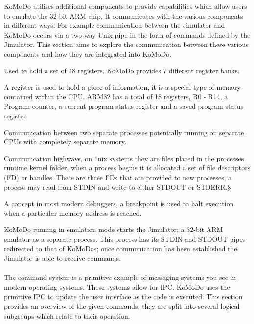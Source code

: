 KoMoDo utilises additional components to provide capabilities which allow users to emulate the 32-bit ARM chip. It communicates with the various components in different ways. For example communication between the Jimulator and KoMoDo occurs via a two-way Unix pipe in the form of commands defined by the Jimulator. This section aims to explore the communication between these various components and how they are integrated into KoMoDo.

  \begin{description}[leftmargin=!,labelwidth=\widthof{\bfseries \footnotesize inter process communication}]
    \item[\footnotesize Register bank] Used to hold a set of 18 registers. KoMoDo provides 7 different register banks.
    \item[\footnotesize Register] A register is used to hold a piece of information, it is a special type of memory contained within the CPU. ARM32 has a total of 18 registers, R0 - R14, a Program counter, a current program status register and a saved program status register.
    \item[\footnotesize Inter process communication] Communication between two separate processes potentially running on separate CPUs with completely separate memory.
    \item[\footnotesize (*nix) pipes] Communication highways, on *nix systems they are files placed in the processes runtime kernel folder, when a process begins it is allocated a set of file descriptors (FD) or handles. There are three FDs that are provided to new processes; a process may read from STDIN and write to  either STDOUT or STDERR.§
    \item[\footnotesize breakpoint] A concept in most modern debuggers, a breakpoint is used to halt execution when a particular memory address is reached.
  \end{description}
%
KoMoDo running in emulation mode starts the Jimulator; a 32-bit ARM emulator as a separate process. This process has its STDIN and STDOUT pipes redirected to that of KoMoDos; once communication has been established the Jimulator is able to receive commands.\\\\
%
The command system is a primitive example of messaging systems you see in modern operating systems. These systems allow for IPC. KoMoDo uses the primitive IPC to update the user interface as the code is executed. This section provides an overview of the given commands, they are split into several logical subgroups which relate to their operation.
